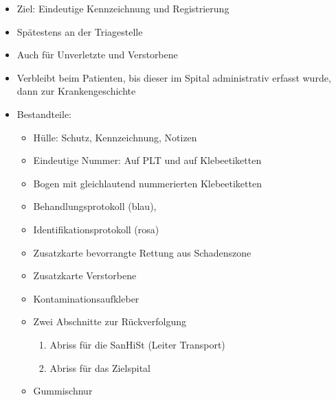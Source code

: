 {}{
\begin{itemize}
  \item Ziel: Eindeutige Kennzeichnung und Registrierung
  \item {Spätestens an der Triagestelle}
  \item Auch für Unverletzte und Verstorbene 
  \item Verbleibt beim Patienten, 
  bis dieser im Spital administrativ erfasst 
  wurde, 
  dann zur Krankengeschichte
  \item Bestandteile:
  \begin{itemize}
      \item Hülle: Schutz, Kennzeichnung, Notizen
      \item Eindeutige Nummer: Auf PLT und auf Klebeetiketten
      \item Bogen mit gleichlautend {nummerierten Klebeetiketten}
      \item {Behandlungsprotokoll} (blau),
      \item {Identifikationsprotokoll} (rosa) 
      \item {Zusatzkarte}  
      {} 
      \dotfill bevorrangte Rettung aus Schadenszone
      \item {Zusatzkarte} 
      {} 
      \dotfill Verstorbene
      \item {Kontaminationsaufkleber}
      \item {Zwei Abschnitte} zur Rückverfolgung 
      \begin{enumerate}
        \item {Abriss für die SanHiSt} (Leiter Transport) 
        \item {Abriss für das Zielspital}
      \end{enumerate}
      \item Gummischnur
    \end{itemize}
\end{itemize}
}{}{}{}

\begin{Synopsis}
\end{Synopsis}



